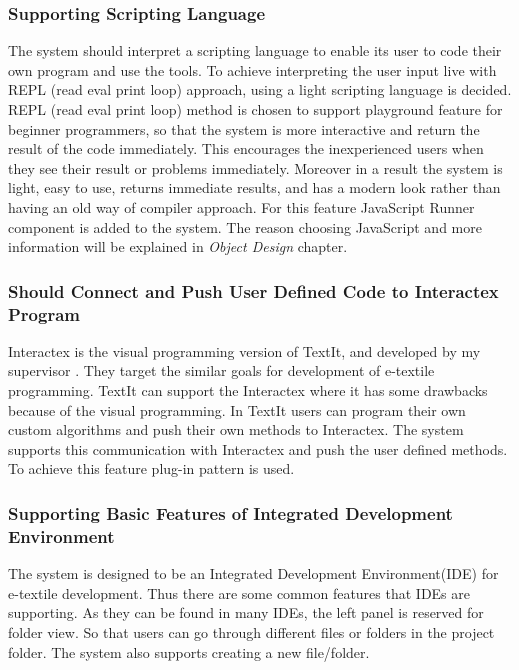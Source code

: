 	\subsubsection{Supporting Scripting Language} 
	The system should interpret a scripting language to enable its user to code their own program and use the tools. To achieve interpreting the user input live with REPL (read eval print loop) approach, using a light scripting language is decided. REPL (read eval print loop) method is chosen to support playground feature for beginner programmers, so that the system is more interactive and return the result of the code immediately. This encourages the inexperienced users when they see their result or problems immediately. Moreover in a result the system is light, easy to use, returns immediate results, and has a modern look rather than having an old way of compiler approach. For this feature JavaScript Runner component is added to the system. The reason choosing JavaScript and more information will be explained in \textit{Object Design} chapter.
	
	\subsubsection{Should Connect and Push User Defined Code to Interactex Program} 
	Interactex is the visual programming version of TextIt, and developed by my supervisor \advisor . They target the similar goals for development of e-textile programming. TextIt can support the Interactex where it has some drawbacks because of the visual programming. In TextIt users can program their own custom algorithms and push their own methods to Interactex. The system supports this communication with Interactex and push the user defined methods. To achieve this feature plug-in pattern is used. 
	
	\subsubsection{Supporting Basic Features of Integrated Development Environment} 
	The system is designed to be an Integrated Development Environment(IDE) for e-textile development. Thus there are some common features that IDEs are supporting. As they can be found in many IDEs, the left panel is reserved for folder view. So that users can go through different files or folders in the project folder. The system also supports creating a new file/folder. 
	
